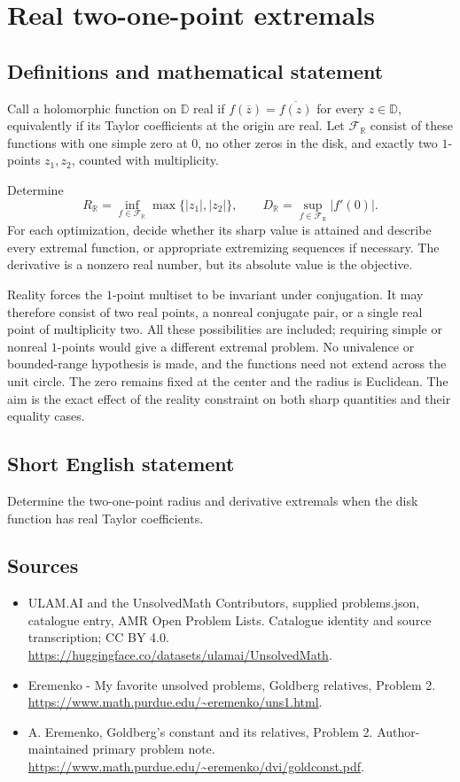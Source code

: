 \documentclass[11pt,a4paper]{article}
\begin{document}
\section*{Real two-one-point extremals}\label{statement}

\subsection{Definitions and mathematical statement}
Call a holomorphic function on $\mathbb D$ real if
$f(\overline z)=\overline{f(z)}$ for every $z\in\mathbb D$,
equivalently if its Taylor coefficients at the origin
are real. Let $\mathcal F_{\mathbb R}$ consist of these
functions with one simple zero at $0$, no other zeros
in the disk, and exactly two $1$-points $z_1,z_2$,
counted with multiplicity.

Determine
\[
 R_{\mathbb R}=\inf_{f\in\mathcal F_{\mathbb R}}
                         \max\{|z_1|,|z_2|\},
 \qquad
 D_{\mathbb R}=\sup_{f\in\mathcal F_{\mathbb R}}|f'(0)|.
\]
For each optimization, decide whether its sharp value
is attained and describe every extremal function, or
appropriate extremizing sequences if necessary.
The derivative is a nonzero real number, but its
absolute value is the objective.

Reality forces the $1$-point multiset to be invariant
under conjugation. It may therefore consist of two
real points, a nonreal conjugate pair, or a single
real point of multiplicity two. All these possibilities
are included; requiring simple or nonreal $1$-points
would give a different extremal problem.
No univalence or bounded-range hypothesis is made,
and the functions need not extend across the unit
circle. The zero remains fixed at the center and
the radius is Euclidean. The aim is the exact effect
of the reality constraint on both sharp quantities
and their equality cases.
\subsection{Short English statement}
Determine the two-one-point radius and derivative extremals when the disk function has real Taylor coefficients.
\subsection{Sources}
\begin{itemize}
\item[S1] ULAM.AI and the UnsolvedMath Contributors, supplied problems.json, catalogue entry, AMR Open Problem Lists. Catalogue identity and source transcription; CC BY 4.0.
\url{https://huggingface.co/datasets/ulamai/UnsolvedMath}.
\item[S2] Eremenko - My favorite unsolved problems, Goldberg relatives, Problem 2. 
\url{https://www.math.purdue.edu/~eremenko/uns1.html}.
\item[S3] A. Eremenko, Goldberg's constant and its relatives, Problem 2. Author-maintained primary problem note.
\url{https://www.math.purdue.edu/~eremenko/dvi/goldconst.pdf}.
\end{itemize}
\end{document}
